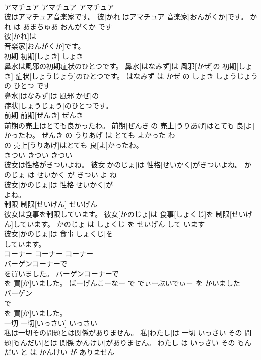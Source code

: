 \documentclass[8pt]{extreport}
\begin{document}
\begin{CJK}{UTF8}{min}
\\	アマチュア	アマチュア	アマチュア	
\\	彼はアマチュア音楽家です。	彼[かれ]はアマチュア 音楽家[おんがくか]です。	かれ は あまちゅあ おんがくか です	
\\	彼[かれ]は
\\	音楽家[おんがくか]です。			
\\	初期	初期[しょき]	しょき	
\\	鼻水は風邪の初期症状のひとつです。	鼻水[はなみず]は 風邪[かぜ]の 初期[しょき] 症状[しょうじょう]のひとつです。	はなみず は かぜ の しょき しょうじょう の ひとつ です	
\\	鼻水[はなみず]は 風邪[かぜ]の
\\	症状[しょうじょう]のひとつです。			
\\	前期	前期[ぜんき]	ぜんき	
\\	前期の売上はとても良かったわ。	前期[ぜんき]の 売上[うりあげ]はとても 良[よ]かったわ。	ぜんき の うりあげ は とても よかった わ	
\\	の 売上[うりあげ]はとても 良[よ]かったわ。			
\\	きつい	きつい	きつい	
\\	彼女は性格がきついよね。	彼女[かのじょ]は 性格[せいかく]がきついよね。	かのじょ は せいかく が きつい よ ね	
\\	彼女[かのじょ]は 性格[せいかく]が
\\	よね。			
\\	制限	制限[せいげん]	せいげん	
\\	彼女は食事を制限しています。	彼女[かのじょ]は 食事[しょくじ]を 制限[せいげん]しています。	かのじょ は しょくじ を せいげん して います	
\\	彼女[かのじょ]は 食事[しょくじ]を
\\	しています。			
\\	コーナー	コーナー	コーナー	
\\	バーゲンコーナーで
\\	を買いました。	バーゲンコーナーで 
\\	[でぃーぶいでぃー]を 買[か]いました。	ばーげんこーなー で でぃーぶいでぃー を かいました	
\\	バーゲン
\\	で 
\\	[でぃーぶいでぃー]を 買[か]いました。			
\\	一切	一切[いっさい]	いっさい	
\\	私は一切その問題とは関係がありません。	私[わたし]は 一切[いっさい]その 問題[もんだい]とは 関係[かんけい]がありません。	わたし は いっさい その もんだい と は かんけい が ありません	

\end{CJK}
\end{document}
